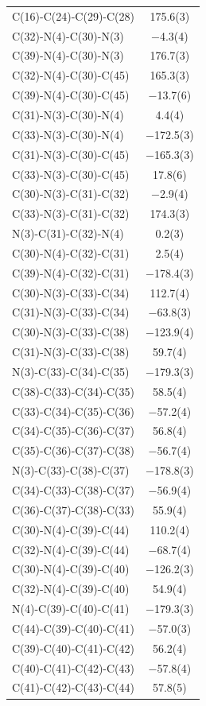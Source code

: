 \begin{center}
{\begin{supertabular}{p{1.5in}c}
C(16)-C(24)-C(29)-C(28)&175.6(3)\\
C(32)-N(4)-C(30)-N(3)&$-$4.3(4)\\
C(39)-N(4)-C(30)-N(3)&176.7(3)\\
C(32)-N(4)-C(30)-C(45)&165.3(3)\\
C(39)-N(4)-C(30)-C(45)&$-$13.7(6)\\
C(31)-N(3)-C(30)-N(4)&4.4(4)\\
C(33)-N(3)-C(30)-N(4)&$-$172.5(3)\\
C(31)-N(3)-C(30)-C(45)&$-$165.3(3)\\
C(33)-N(3)-C(30)-C(45)&17.8(6)\\
C(30)-N(3)-C(31)-C(32)&$-$2.9(4)\\
C(33)-N(3)-C(31)-C(32)&174.3(3)\\
N(3)-C(31)-C(32)-N(4)&0.2(3)\\
C(30)-N(4)-C(32)-C(31)&2.5(4)\\
C(39)-N(4)-C(32)-C(31)&$-$178.4(3)\\
C(30)-N(3)-C(33)-C(34)&112.7(4)\\
C(31)-N(3)-C(33)-C(34)&$-$63.8(3)\\
C(30)-N(3)-C(33)-C(38)&$-$123.9(4)\\
C(31)-N(3)-C(33)-C(38)&59.7(4)\\
N(3)-C(33)-C(34)-C(35)&$-$179.3(3)\\
C(38)-C(33)-C(34)-C(35)&58.5(4)\\
C(33)-C(34)-C(35)-C(36)&$-$57.2(4)\\
C(34)-C(35)-C(36)-C(37)&56.8(4)\\
C(35)-C(36)-C(37)-C(38)&$-$56.7(4)\\
N(3)-C(33)-C(38)-C(37)&$-$178.8(3)\\
C(34)-C(33)-C(38)-C(37)&$-$56.9(4)\\
C(36)-C(37)-C(38)-C(33)&55.9(4)\\
C(30)-N(4)-C(39)-C(44)&110.2(4)\\
C(32)-N(4)-C(39)-C(44)&$-$68.7(4)\\
C(30)-N(4)-C(39)-C(40)&$-$126.2(3)\\
C(32)-N(4)-C(39)-C(40)&54.9(4)\\
N(4)-C(39)-C(40)-C(41)&$-$179.3(3)\\
C(44)-C(39)-C(40)-C(41)&$-$57.0(3)\\
C(39)-C(40)-C(41)-C(42)&56.2(4)\\
C(40)-C(41)-C(42)-C(43)&$-$57.8(4)\\
C(41)-C(42)-C(43)-C(44)&57.8(5)\\

\end{supertabular}}
\end{center}
